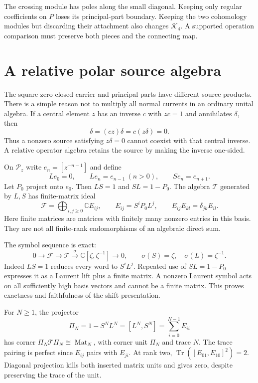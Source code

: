 The crossing module has poles along the small diagonal.
Keeping only regular coefficients on $P$ loses its
principal-part boundary. Keeping the two cohomology modules
but discarding their attachment also changes $\mathcal K_4$.
A supported operation comparison must preserve both pieces
and the connecting map.

\section{A relative polar source algebra}

The square-zero closed carrier and principal parts have
different source products. There is a simple reason not
to multiply all normal currents in an ordinary unital algebra.
If a central element $z$ has an inverse $c$ with $zc=1$
and annihilates $\delta$, then
\[
 \delta=(cz)\delta=c(z\delta)=0.
\]
Thus a nonzero source satisfying $z\delta=0$ cannot
coexist with that central inverse. A relative operator
algebra retains the source by making the inverse one-sided.

On $\mathcal P_z$ write $e_n=[z^{-n-1}]$ and define
\[
 Le_0=0,\qquad Le_n=e_{n-1}\ (n>0),\qquad Se_n=e_{n+1}.
\]
Let $P_0$ project onto $e_0$. Then $LS=1$ and
$SL=1-P_0$. The algebra $\mathcal T$ generated by $L,S$
has finite-matrix ideal
\[
 \mathcal F=\bigoplus_{i,j\geq0}\mathbb C E_{ij},
 \qquad E_{ij}=S^iP_0L^j,
 \qquad E_{ij}E_{kl}=\delta_{jk}E_{il}.
\]
Here finite matrices are matrices with finitely many
nonzero entries in this basis. They are not all
finite-rank endomorphisms of an algebraic direct sum.

The symbol sequence is exact:
\begin{equation}\label{mht:eq:polar-symbol-extension}
 0\longrightarrow\mathcal F\longrightarrow\mathcal T
 \xrightarrow{\sigma}\mathbb C[\zeta,\zeta^{-1}]
 \longrightarrow0,
 \qquad \sigma(S)=\zeta,\quad\sigma(L)=\zeta^{-1}.
\end{equation}
Indeed $LS=1$ reduces every word to $S^iL^j$.
Repeated use of $SL=1-P_0$ expresses it as a Laurent
lift plus a finite matrix. A nonzero Laurent symbol
acts on all sufficiently high basis vectors and cannot
be a finite matrix. This proves exactness and faithfulness
of the shift presentation.

For $N\geq1$, the projector
\[
 \Pi_N=1-S^NL^N=[L^N,S^N]=\sum_{i=0}^{N-1}E_{ii}
\]
has corner $\Pi_N\mathcal T\Pi_N\cong\operatorname{Mat}_N$,
with corner unit $\Pi_N$ and trace $N$.
The trace pairing is perfect since $E_{ij}$ pairs with
$E_{ji}$. At rank two,
$\operatorname{Tr}([E_{01},E_{10}]^2)=2$.
Diagonal projection kills both inserted matrix units and
gives zero, despite preserving the trace of the unit.


